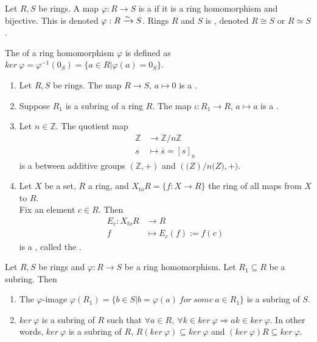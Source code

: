 \begin{definition}
Let $R, S$ be rings. A map $\varphi: R \rightarrow S$ is a  if it is a ring homomorphism and bijective.
This is denoted $\varphi: R \xrightarrow{\sim} S$. Rings $R$ and $S$ is , denoted $R \cong S$ or $R \simeq S$.
\end{definition}


\begin{definition}
The  of a ring homomorphism $\varphi$ is defined as $ker \ \varphi = \varphi^{-1}(0_S) = \{a \in R | \varphi(a) = 0_S\} $.
\end{definition}


\begin{remark}
\begin{enumerate}[label=(\roman*)]
\item Let $R, S$ be rings. The map $R \rightarrow S$, $a \mapsto 0$ is a .
\item Suppose $R_1$ is a subring of a ring $R$. The map $\iota: R_1 \rightarrow R$, $a \mapsto a$ is a .
\item Let $n \in \mathbb{Z}$. The quotient map 
\begin{align}
\mathbb{Z} &\rightarrow \mathbb{Z}/n\mathbb{Z} \nonumber \\
s &\mapsto \overline{s} = [s]_n \nonumber
\end{align} 
is a  between additive groups $(\mathbb{Z}, +)$ and $(\mathbb(Z)/n\mathbb(Z), +)$.
\item Let $X$ be a set, $R$ a ring, and $X_{to}R = \{f: X \rightarrow R\}$ the ring of all maps from $X$ to $R$.\\
Fix an element $c\in R$. Then 
\begin{align}
E_c: X_{to}R &\rightarrow R \nonumber \\
f &\mapsto E_c(f) := f(c) \nonumber
\end{align}
is a , called the .
\end{enumerate}
\end{remark}


\begin{proposition}
Let $R, S$ be rings and $\varphi: R \rightarrow S$ be a ring homomorphism. Let $R_1 \subseteq R$ be a subring. Then
\begin{enumerate}[label=(\roman*)]
\item The $\varphi$-image $\varphi(R_1) = \{b \in S | b = \varphi(a) \ for \ some \ a \in R_1\}$ is a subring of $S$.
\item $ker \ \varphi$ is a subring of $R$ such that $\forall a \in R, \ \forall k \in ker \ \varphi \Rightarrow ak \in ker \ \varphi$. In other words, $ker \ \varphi$ is a subring of $R$, $R(ker \ \varphi) \subseteq ker \ \varphi$ and $(ker \ \varphi)R \subseteq ker \ \varphi$.
\end{enumerate}
\end{proposition}


